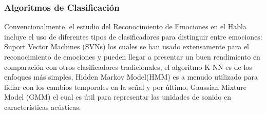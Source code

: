 \documentclass[11pt,a4paper,spanish]{book}
\begin{document}

	
	\subsubsection{Algoritmos de Clasificación}
	

	Convencionalmente, el estudio del Reconocimiento de Emociones en el Habla incluye el uso de diferentes tipos de clasificadores para distinguir entre emociones: Suport Vector Machines (SVNs) los cuales se han usado extensamente
	para el reconocimiento de emociones y pueden llegar a presentar un buen rendimiento en comparación con otros clasificadores tradicionales, el algoritmo K-NN es de los enfoques más simples, Hidden Markov Model(HMM) es a menudo utilizado para lidiar con los cambios temporales en la señal y por último, Gaussian Mixture Model (GMM) el cual es útil para representar las unidades de sonido en características acústicas.%
	
\end{document}
